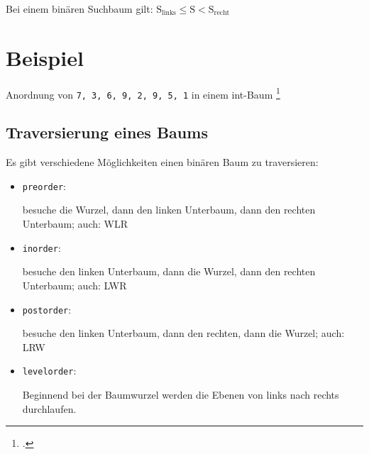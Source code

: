 \documentclass{lehramt-informatik-haupt}
\begin{document}
Bei einem binären Suchbaum gilt:
$\text{S}_\text{links} \leq \text{S} < \text{S}_\text{recht}$

\section{Beispiel}

Anordnung von \verb|7, 3, 6, 9, 2, 9, 5, 1| in einem int-Baum
\footcite[Seite 5]{aud:fs:5}

\begin{center}
\end{center}

%

\subsection{Traversierung eines Baums}

Es gibt verschiedene Möglichkeiten einen binären Baum zu
traversieren:

\begin{itemize}
\item \texttt{preorder}:

besuche die Wurzel, dann den linken Unterbaum, dann den rechten
Unterbaum; auch: WLR


\item \texttt{inorder}:

besuche den linken Unterbaum, dann die Wurzel, dann den rechten
Unterbaum;
auch: LWR


\item \texttt{postorder}:

besuche den linken Unterbaum, dann den rechten, dann die Wurzel;
auch: LRW


\item \texttt{levelorder}:

Beginnend bei der Baumwurzel werden die
Ebenen von links nach rechts durchlaufen.


\end{itemize}
\end{document}
